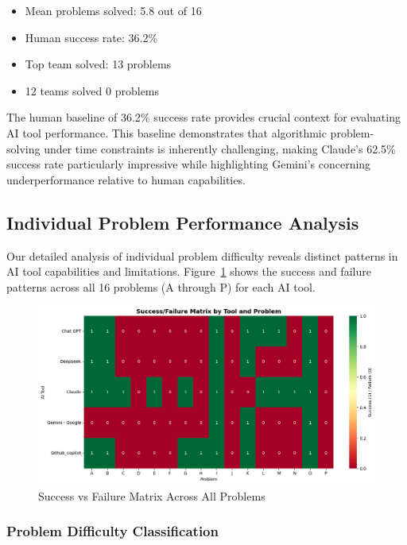 \documentclass[conference]{IEEEtran}
\begin{document}
\begin{itemize}
    \item Mean problems solved: 5.8 out of 16
    \item Human success rate: 36.2\%
    \item Top team solved: 13 problems
    \item 12 teams solved 0 problems
\end{itemize}

The human baseline of 36.2\% success rate provides crucial context for evaluating AI tool performance. This baseline demonstrates that algorithmic problem-solving under time constraints is inherently challenging, making Claude's 62.5\% success rate particularly impressive while highlighting Gemini's concerning underperformance relative to human capabilities.

\subsection{Individual Problem Performance Analysis}

Our detailed analysis of individual problem difficulty reveals distinct patterns in AI tool capabilities and limitations. Figure~\ref{fig:success_failure_matrix} shows the success and failure patterns across all 16 problems (A through P) for each AI tool.

\begin{figure}[htbp]
\centering
\includegraphics[width=0.85\linewidth]{images/ai_tools_images_updated/success_vs_faliure_matrix.png}
\caption{Success vs Failure Matrix Across All Problems}
\label{fig:success_failure_matrix}
\end{figure}

\subsubsection{Problem Difficulty Classification}
\end{document}
